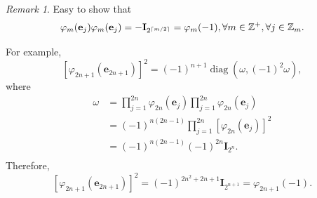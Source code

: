 \documentclass[12pt, letterpaper]{article}
\newcommand{\inte}{\mathbb{Z}}
\DeclarePairedDelimiter\ceil{\lceil}{\rceil}
\newcommand{\idm}{\mathbf{I}}
\newcommand{\bfe}{\mathbf{e}}
\DeclareMathOperator{\diag}{diag}
\theoremstyle{definition}
\theoremstyle{remark}
\newtheorem*{rem*}{Remark}
\theoremstyle{definition}
\theoremstyle{plain}
\numberwithin{equation}{section}
\begin{document}
	\begin{rem*}
		Easy to show that \[\varphi_{m}(\bfe_{j})\varphi_{m}(\bfe_{j})=-\idm_{2^{\ceil{m/2}}}=\varphi_m(-1),\forall m\in \inte^+,\forall j\in \inte_m.\]
		
		For example,
		\[
		\left[\varphi_{2n+1}(\bfe_{2n+1})\right]^2=(-1)^{n+1}
			\diag (\omega,
			(-1)^2\omega),\]
		where
		\[\begin{aligned}
			\omega&=\prod_{j=1}^{2n}\varphi_{2n}(\bfe_{j})\prod_{j=1}^{2n}\varphi_{2n}(\bfe_{j})\\
			&=(-1)^{n(2n-1)}\prod_{j=1}^{2n}\left[\varphi_{2n}(\bfe_{j})\right]^2\\
			&=(-1)^{n(2n-1)}(-1)^{2n}\idm_{2^n}.\\
		\end{aligned}\]
		Therefore,
		\[\left[\varphi_{2n+1}(\bfe_{2n+1})\right]^2=(-1)^{2n^2+2n+1}
		\idm_{2^{n+1}}=\varphi_{2n+1}(-1).\]
	\end{rem*}
\end{document}
